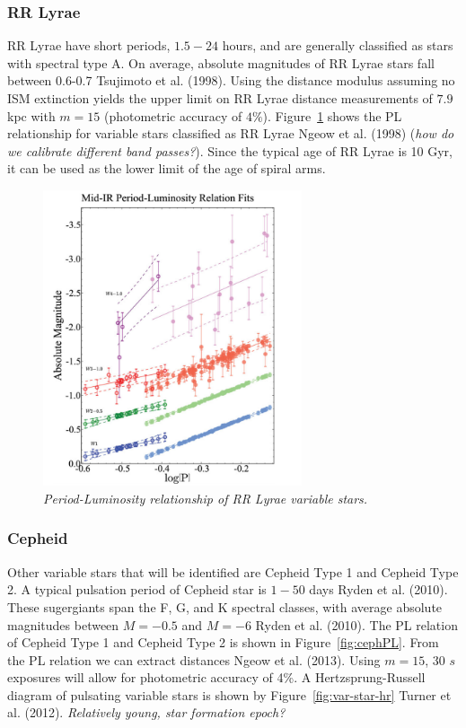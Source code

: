 \documentclass[letterpaper,11pt]{article}
\begin{document}
\subsubsection{RR Lyrae}
RR Lyrae have short periods, $1.5 - 24$ hours, and are generally classified as stars with spectral type A.  On average, absolute magnitudes of RR Lyrae stars fall between 0.6-0.7 Tsujimoto et al. (1998). Using the distance modulus assuming no ISM extinction yields the upper limit on RR Lyrae distance measurements of $7.9$ kpc with $m=15$ (photometric accuracy of $4\%$). Figure~\ref{fig:plrelationrrlyrae} shows the PL relationship for variable stars classified as RR Lyrae Ngeow et al. (1998) (\textit{how do we calibrate different band passes?}). Since the typical age of RR Lyrae is 10 Gyr, it can be used as the lower limit of the age of spiral arms.  
\begin{figure}[H]%
  \begin{center}
\centerline{\includegraphics[width=3in]{figures/PL_relation}}
\caption{\it \small{Period-Luminosity relationship of RR Lyrae variable stars. \label{fig:plrelationrrlyrae}}}
  \end{center}
\end{figure}


\subsubsection{Cepheid}

Other variable stars that will be identified are Cepheid Type 1 and Cepheid Type 2.  A typical pulsation period of Cepheid star is $1 - 50$ days Ryden et al. (2010).  These sugergiants span the F, G, and K spectral classes, with average absolute magnitudes between $M=-0.5$ and $M=-6$ Ryden et al. (2010).  The PL relation of Cepheid Type 1 and Cepheid Type 2 is shown in Figure~\ref{fig:cephPL}. From the PL relation we can extract distances Ngeow et al. (2013). Using $m=15$, 30 $s$ exposures will allow for photometric accuracy of 4\%.  A Hertzsprung-Russell diagram of pulsating variable stars is shown by Figure~\ref{fig:var-star-hr} Turner et al. (2012). \textit{Relatively young, star formation epoch?}
\end{document}
